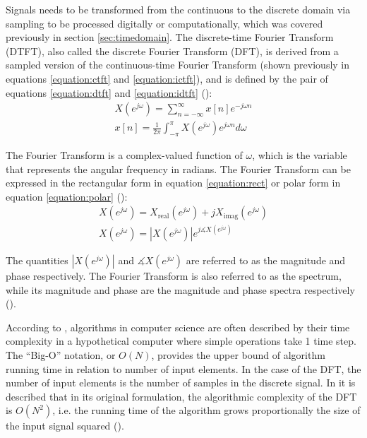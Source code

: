 \documentclass[report.tex]{subfiles}
\begin{document}
Signals needs to be transformed from the continuous to the discrete domain via sampling to be processed digitally or computationally, which was covered previously in section \ref{sec:timedomain}. The discrete-time Fourier Transform (DTFT), also called the discrete Fourier Transform (DFT), is derived from a sampled version of the continuous-time Fourier Transform (shown previously in equations \ref{equation:ctft} and \ref{equation:ictft}), and is defined by the pair of equations \ref{equation:dtft} and \ref{equation:idtft} (\cite[Chapter~12]{melbook}):
\begin{align}
	X(e^{j\omega}) = \sum_{n = -\infty}^{\infty}{x[n]e^{-j\omega n}} \tag{3}\label{equation:dtft} \\
	x[n] = \frac{1}{2\pi}\int_{-\pi}^{\pi}{X(e^{j\omega})e^{j\omega n}\mathit{d\omega}} \tag{4}\label{equation:idtft}
\end{align}

The Fourier Transform is a complex-valued function of $\omega$, which is the variable that represents the angular frequency in radians. The Fourier Transform can be expressed in the rectangular form in equation \ref{equation:rect} or polar form in equation \ref{equation:polar} (\cite[Chapter~2]{discretebook}):
\begin{align}
	X(e^{j\omega}) = X_{\text{real}}(e^{j\omega}) + j X_{\text{imag}}(e^{j\omega}) \tag{5}\label{equation:rect} \\
	X(e^{j\omega}) = |X(e^{j\omega})|e^{j\measuredangle X(e^{j\omega})} \tag{6}\label{equation:polar}
\end{align}

The quantities $|X(e^{j\omega})|$ and $\measuredangle X(e^{j\omega})$ are referred to as the magnitude and phase respectively. The Fourier Transform is also referred to as the spectrum, while its magnitude and phase are the magnitude and phase spectra respectively (\cite{discretebook}).

According to \textcite{skiena}, algorithms in computer science are often described by their time complexity in a hypothetical computer where simple operations take 1 time step. The ``Big-O'' notation, or $O(N)$, provides the upper bound of algorithm running time in relation to number of input elements. In the case of the DFT, the number of input elements is the number of samples in the discrete signal. In \textcite[Chapter~9]{discretebook} it is described that in its original formulation, the algorithmic complexity of the DFT is $O(N^{2})$, i.e. the running time of the algorithm grows proportionally the size of the input signal squared (\cite{skiena}). 
\end{document}
